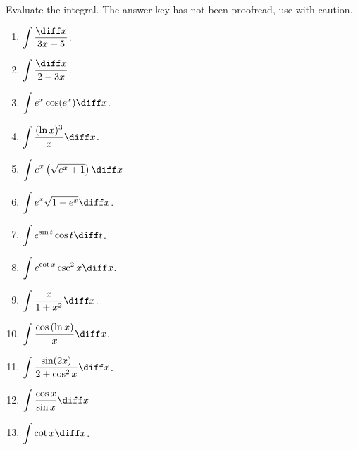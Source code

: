 Evaluate the integral. The answer key has not been proofread, use with caution.
\begin{multicols}{3}
\begin{enumerate}[ref={\fcProblemRef}]
\item $\displaystyle\int \frac{\diff x}{3x+5} $.


\item $\displaystyle\int \frac{\diff x}{2-3x}$.

\item $\displaystyle\int e^x\cos (e^x) \diff x$.

\item $\displaystyle\int \frac{(\ln x)^3}{x} \diff x$.

\item \label{probleminte^x(sqrt(e^x+1))dx} ${\displaystyle \int e^x \left(\sqrt{e^x + 1}\right) \diff x}$

\item $\displaystyle\int e^x\sqrt{1-e^x} \diff x$.

\item $\displaystyle\int e^{\sin t }\cos t \diff t$.

\item $\displaystyle\int e^{\cot x}\csc^2x \diff x$.

\item $\displaystyle\int \frac{x}{1+x^2} \diff x$. 

\item $\displaystyle\int \frac{\cos \left(\ln x\right)}{x} \diff x$.

\item \label{problemintsin(2x)/(2+cos^2x)dx} $\displaystyle\int \frac{\sin (2x)}{2+\cos^2x}\diff x$.

\item ${\displaystyle \int \frac{\cos x}{\sin x} \diff x}$

\item $\displaystyle\int \cot x \diff x$.



\end{enumerate}
\end{multicols}
